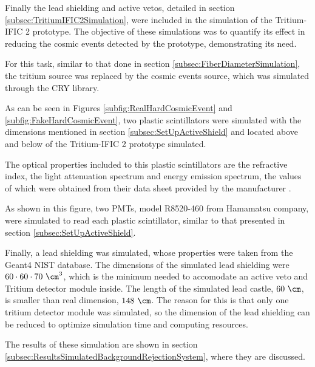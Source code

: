 Finally the lead shielding and active vetos, detailed in section \ref{subsec:TritiumIFIC2Simulation}, were included in the simulation of the Tritium-IFIC 2 prototype. The objective of these simulations was to quantify its effect in reducing the cosmic events detected by the prototype, demonstrating its need.

For this task, similar to that done in section \ref{subsec:FiberDiameterSimulation}, the tritium source was replaced by the cosmic events source, which was simulated through the CRY library.

As can be seen in Figures \ref{subfig:RealHardCosmicEvent} and \ref{subfig:FakeHardCosmicEvent}, two plastic scintillators were simulated with the dimensions mentioned in section \ref{subsec:SetUpActiveShield} and located above and below of the Tritium-IFIC 2 prototype simulated. 

The optical properties included to this plastic scintillators are the refractive index, the light attenuation spectrum and energy emission spectrum, the values of which were obtained from their data sheet provided by the manufacturer \cite{ScintillatorVeto}.

As shown in this figure, two PMTs, model R8520-460 from Hamamatsu company, were simulated to read each plastic scintillator, similar to that presented in section \ref{subsec:SetUpActiveShield}.

Finally, a lead shielding was simulated, whose properties were taken from the Geant4 NIST database. The dimensions of the simulated lead shielding were $60 \cdot{} 60 \cdot{} 70~\cm^3$, which is the minimum needed to accomodate an active veto and Tritium detector module inside. The length of the simulated lead castle, $60~\cm$, is smaller than real dimension, $148~\cm$. The reason for this is that only one tritium detector module was simulated, so the dimension of the lead shielding can be reduced to optimize simulation time and computing resources.

The results of these simulation are shown in section \ref{subsec:ResultsSimulatedBackgroundRejectionSystem}, where they are discussed.
